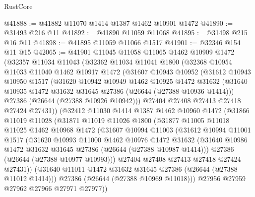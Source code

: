 \begin{lexlean}{RustCore}
\begin{coremodule}
@41888 := @41882 @11070 @1414 @1387 @1462 @10901 @1472
@41890 := @31493 @216 @11
@41892 := @41890 @11059 @11068
@41895 := @31498 @215 @16 @11
@41898 := @41895 @11059 @11066 @1517
@41901 := @32346 @154 @11 @15
@42065 := @41901
    @11045
    @11058
    @11065
    @1462
    @10909
    @1472
    (@32357
      @11034
      @11043
      (@32362
        @11034
        @11041
        @1800
        (@32368
          @10954
          @11033
          @11040
          @1462
          @10917
          @1472
          (@31607
            @10943
            @10952
            (@31612
              @10943
              @10950
              @1517
              (@31620
                @10942
                @10949
                @1462
                @10925
                @1472
                @31632
                (@31640 @10935 @1472 @31632 @31645 @27386 (@26644 (@27388 @10936 @1414)))
                @27386
                (@26644 (@27388 @10926 @10942)))
              @27404
              @27408
              @27413
              @27418
              @27424
              @27431))
          (@32412
            @11030
            @1414
            @1387
            @1462
            @10960
            @1472
            (@31866
              @11019
              @11028
              (@31871
                @11019
                @11026
                @1800
                (@31877
                  @11005
                  @11018
                  @11025
                  @1462
                  @10968
                  @1472
                  (@31607
                    @10994
                    @11003
                    (@31612
                      @10994
                      @11001
                      @1517
                      (@31620
                        @10993
                        @11000
                        @1462
                        @10976
                        @1472
                        @31632
                        (@31640 @10986 @1472 @31632 @31645 @27386 (@26644 (@27388 @10987 @1414)))
                        @27386
                        (@26644 (@27388 @10977 @10993)))
                      @27404
                      @27408
                      @27413
                      @27418
                      @27424
                      @27431))
                  (@31640 @11011 @1472 @31632 @31645 @27386 (@26644 (@27388 @11012 @1414)))
                  @27386
                  (@26644 (@27388 @10969 @11018)))
                @27956
                @27959
                @27962
                @27966
                @27971
                @27977))

\end{coremodule}
\end{lexlean}
